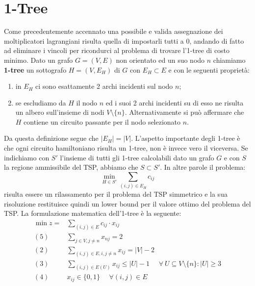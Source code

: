 \documentclass[
	article,			%
	12pt,				%
	oneside,			%
	a4paper,			%
	english,			%
	italian,				%
	sumario=tradicional,
	]{abntex2}
\begin{document}
\section{1-Tree}
Come precedentemente accennato una possibile e valida assegnazione dei moltiplicatori lagrangiani risulta quella di impostarli tutti a 0, andando di fatto ad eliminare i vincoli per ricondurci al problema di trovare l'1-tree di costo minimo.
\newline
Dato un grafo $G=(V,E)$ non orientato ed un suo nodo $n$ chiamiamo \textbf{1-tree} un sottografo $H = (V, E_H)$ di $G$ con $E_H \subset E$ e con le seguenti proprietà:
\begin{enumerate}
    \item in $E_H$ ci sono esattamente 2 archi incidenti sul nodo $n$;
    \item se escludiamo da $H$ il nodo $n$ ed i suoi 2 archi incidenti su di esso ne risulta un albero sull'insieme di nodi $V \setminus \{n\}$. Alternativamente si può affermare che $H$ contiene un circuito passante per il nodo selezionato $n$.
\end{enumerate}
Da questa definizione segue che $|E_H| = |V|$.
\newline
L'aspetto importante degli 1-tree è che ogni circuito hamiltoniano risulta un 1-tree, non è invece vero il viceversa. Se indichiamo con $S'$ l'insieme di tutti gli 1-tree calcolabili dato un grafo $G$ e con $S$ la regione ammissibile del TSP, abbiamo che $S \subset S'$.
In altre parole il problema:
\begin{equation*}
    \min_{H\in S'} \sum_{(i,j) \in E_H} c_{ij}
\end{equation*}
risulta essere un rilassamento per il problema del TSP simmetrico e la sua risoluzione restituisce quindi un lower bound per il valore ottimo del problema del TSP.
\newline
La formulazione matematica dell'1-tree è la seguente:
\begin{equation*}
    \begin{split}
        \min z = & \sum_{(i,j) \in E} c_{ij} \cdot x_{ij}\\
        (5)\:\:\:\:\:\: & \sum_{j \in V, j \neq n} x_{nj} = 2 \\
        (2) \:\:\:\:\:\: & \sum_{(i,j)\in E, i, j \neq n} x_{ij} = |V|-2 \\
        (3) \:\:\:\:\:\: & \sum_{(i,j) \in E(U)} x_{ij} \leq |U| - 1 \:\:\:\:\:\: \forall\: U \subseteq V\setminus\{n\} : |U| \geq 3 \\
        (4) \:\:\:\:\:\: & x_{ij} \in \{0,1\} \:\:\:\:\:\: \forall (i,j) \in E\\
    \end{split}
\end{equation*}
\end{document}
